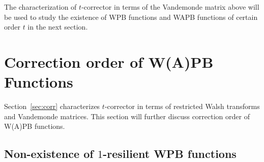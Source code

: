 \documentclass[11pt]{llncs}
\begin{document}
The characterization of $t$-corrector in terms of the Vandemonde matrix above
will be used to study the existence of WPB functions and WAPB functions of
certain order $t$ in the next section.




\section{Correction order of W(A)PB Functions}

Section~\ref{sec:corr} characterizes $t$-corrector in terms of restricted Walsh transforms and Vandemonde matrices. This section will further discuss correction order of W(A)PB functions.



\subsection{Non-existence of $1$-resilient WPB functions}
\end{document}
